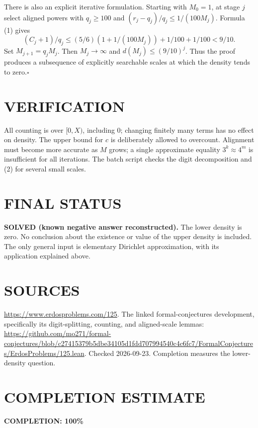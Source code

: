 There is also an explicit iterative formulation. Starting with $M_0=1$,
at stage $j$ select aligned powers with $q_j\ge100$ and
$(r_j-q_j)/q_j\le1/(100M_j)$. Formula (1) gives
\[
 (C_j+1)/q_j\le (5/6)(1+1/(100M_j))+1/100+1/100<9/10.
\]
Set $M_{j+1}=q_jM_j$. Then $M_j\to\infty$ and
$d(M_j)\le(9/10)^j$. Thus the proof produces a subsequence of explicitly
searchable scales at which the density tends to zero.\hfill$\square$

\section{VERIFICATION}
All counting is over $[0,X)$, including $0$; changing finitely many
terms has no effect on density. The upper bound for $c$ is deliberately
allowed to overcount. Alignment must become more accurate as $M$ grows;
a single approximate equality $3^k\approx4^m$ is insufficient for all
iterations. The batch script checks the digit decomposition and (2)
for several small scales.

\section{FINAL STATUS}
\textbf{SOLVED (known negative answer reconstructed).}
The lower density is zero. No conclusion about the existence or value of
the upper density is included. The only general input is elementary
Dirichlet approximation, with its application explained above.

\section{SOURCES}
\url{https://www.erdosproblems.com/125}.
The linked formal-conjectures development, specifically its digit-splitting,
counting, and aligned-scale lemmas:
\url{https://github.com/mo271/formal-conjectures/blob/c27415379b5dbe34105d1fdd707994540c4c6fc7/FormalConjectures/ErdosProblems/125.lean}.
Checked 2026-09-23. Completion measures the lower-density question.

\section{COMPLETION ESTIMATE}
\textbf{COMPLETION: 100\%}
